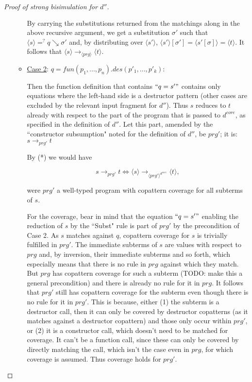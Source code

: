 \begin{proof}[Proof of strong bisimulation for $d''$]
\begin{enumerate}
\begin{itemize}
By carrying the substitutions returned from the matchings along in the above recursive argument, we get a substitution $\sigma'$ such that $\langle s \rangle =^? q \searrow \sigma'$ and, by distributing over $\langle s' \rangle$, $\langle s' \rangle [\sigma'] = \langle s'[\sigma] \rangle = \langle t \rangle$. It follows that $\langle s \rangle \longrightarrow_{\langle prg \rangle} \langle t \rangle$.

\item \underline{Case 2}: $q = fun(p_1, ..., p_n).des(p'_1, ..., p'_k)$:

Then the function definition that contains $`` q = s' "$ contains only equations where the left-hand side is a destructor pattern (other cases are excluded by the relevant input fragment for $d''$). Thus $s$ reduces to $t$ already with respect to the part of the program that is passed to $d^{core}$, as specified in the definition of $d''$. Let this part, amended by the ``constructor subsumption" noted for the definition of $d''$, be $prg'$; it is: $s \longrightarrow_{prg'} t$

By (*) we would have

\begin{equation*}
s \longrightarrow_{prg'} t \iff \langle s \rangle \longrightarrow_{\langle prg' \rangle^{d^{core}}} \langle t \rangle,
\end{equation*}

were $prg'$ a well-typed program with copattern coverage for all subterms of $s$. 

For the coverage, bear in mind that the equation $`` q = s' "$ enabling the reduction of $s$ by the ``Subst" rule is part of $prg'$ by the precondition of Case 2. As $s$ matches against $q$, copattern coverage for $s$ is trivially fulfilled in $prg'$. The immediate subterms of $s$ are values with respect to $prg$ and, by inversion, their immediate subterms and so forth, which especially means that there is no rule in $prg$ against which they match. But $prg$ has copattern coverage for such a subterm (TODO: make this a general precondition) and there is already no rule for it in $prg$. It follows that $prg'$ still has copattern coverage for the subterm even though there is no rule for it in $prg'$. This is because, either (1) the subterm is a destructor call, then it can only be covered by destructor copatterns (as it matches against a destructor copattern) and those only occur within $prg'$, or (2) it is a constructor call, which doesn't need to be matched for coverage. It can't be a function call, since these can only be covered by directly matching the call, which isn't the case even in $prg$, for which coverage is assumed. Thus coverage holds for $prg'$.


\end{itemize}
\end{enumerate}
\end{proof}
